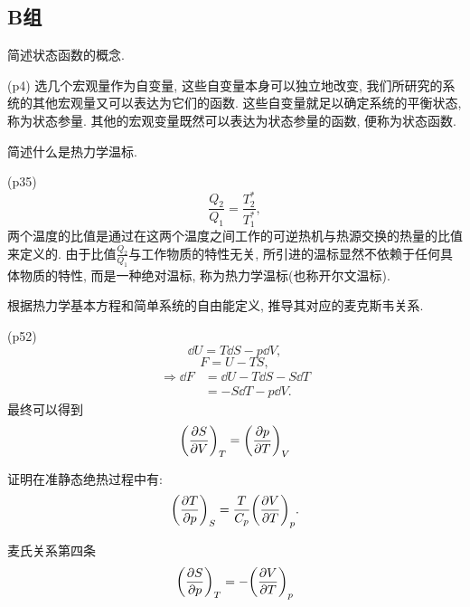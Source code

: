 \subsection{B组}
\begin{questions}
  \question 简述状态函数的概念.
  \begin{solution}
    (p4) 选几个宏观量作为自变量, 这些自变量本身可以独立地改变, 我们所研究的系统的其他宏观量又可以表达为它们的函数. 这些自变量就足以确定系统的平衡状态, 称为状态参量. 其他的宏观变量既然可以表达为状态参量的函数, 便称为状态函数.
  \end{solution}
  \question 简述什么是热力学温标.
  \begin{solution}
    (p35)
    \begin{equation}
      \frac{Q_2}{Q_1} = \frac{T_2^*}{T_1^*},
    \end{equation}
    两个温度的比值是通过在这两个温度之间工作的可逆热机与热源交换的热量的比值来定义的. 由于比值$\frac{Q_2}{Q_1}$与工作物质的特性无关, 所引进的温标显然不依赖于任何具体物质的特性, 而是一种绝对温标, 称为热力学温标(也称开尔文温标).
  \end{solution}
  \question 根据热力学基本方程和简单系统的自由能定义, 推导其对应的麦克斯韦关系.
  \begin{solution}
    (p52)
    \begin{equation}
      \dd U = T\dd S - p\dd V,
    \end{equation}
    \begin{equation}
      F = U - TS,
    \end{equation}
    \begin{equation}
      \begin{aligned}
        \Rightarrow \dd F & = \dd U - T\dd S - S\dd T \\
                          & = -S\dd T - p\dd V.
      \end{aligned}
    \end{equation}
    最终可以得到
    \begin{equation}
      \qty(\pdv{S}{V})_T = \qty(\pdv{p}{T})_V
    \end{equation}
  \end{solution}
  \question 证明在准静态绝热过程中有:
  \begin{equation}
    \qty(\pdv{T}{p})_S = \frac{T}{C_p} \qty(\pdv{V}{T})_p.
  \end{equation}
  \begin{solution}
    麦氏关系第四条
    \begin{equation}
      \qty(\pdv{S}{p})_T = -\qty(\pdv{V}{T})_p

\end{equation}
\end{solution}
\end{questions}
